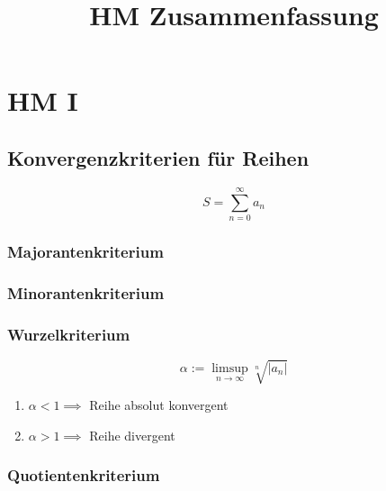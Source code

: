 \documentclass[twoside]{article}
\title{HM Zusammenfassung}
\begin{document}
	\maketitle
	
	\section{HM I}
	
		\subsection{Konvergenzkriterien für Reihen}
			
			\begin{displaymath}
				S = \sum_{n=0}^{\infty} a_{n}
			\end{displaymath}
			
			\subsubsection{Majorantenkriterium}
			
			\subsubsection{Minorantenkriterium}
			
			\subsubsection{Wurzelkriterium}
				
				\begin{displaymath} 
					\alpha := \limsup\limits_{n \to \infty} \sqrt[n]{|a_{n}|}
				\end{displaymath}
				
				\begin{enumerate}[]
					\item \begin{math} \alpha < 1 \implies \end{math} Reihe absolut konvergent
					\item \begin{math} \alpha > 1 \implies \end{math} Reihe divergent
				\end{enumerate}
				
			\subsubsection{Quotientenkriterium}
			
\end{document}
